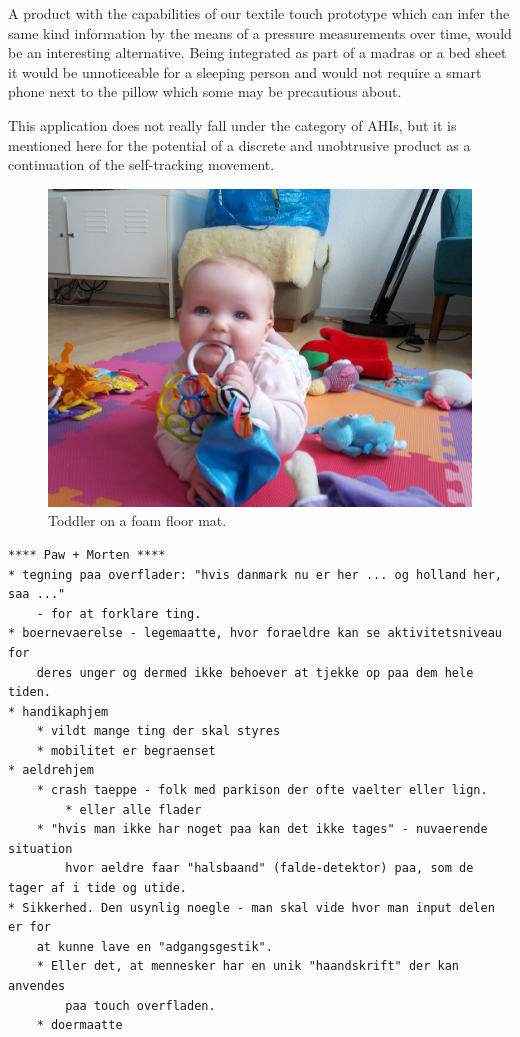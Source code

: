 A product with the capabilities of our textile touch prototype which can infer the same kind information by the means of a pressure measurements over time, would be an interesting alternative.
Being integrated as part of a madras or a bed sheet it would be unnoticeable for a sleeping person and would not require a smart phone next to the pillow which some may be precautious about.

This application does not really fall under the category of AHIs, but it is mentioned here for the potential of a discrete and unobtrusive product as a continuation of the self-tracking movement.


\begin{figure}[h]
  \centering
  \begin{minipage}[b]{.8\textwidth}
    \centering
    \includegraphics[width=.7\linewidth]{figures/touch/evaluation/softtiles}
  \caption[Toddler on a foam floor mat with puzzle-like tiles for extensibility.]
  {Toddler on a foam floor mat.}
  \label{fig:textiletouch:eval:softtiles}
  \end{minipage}
\end{figure}

\begin{verbatim}
**** Paw + Morten ****
* tegning paa overflader: "hvis danmark nu er her ... og holland her, saa ..." 
	- for at forklare ting.
* boernevaerelse - legemaatte, hvor foraeldre kan se aktivitetsniveau for 
	deres unger og dermed ikke behoever at tjekke op paa dem hele tiden.
* handikaphjem
	* vildt mange ting der skal styres
    * mobilitet er begraenset
* aeldrehjem
    * crash taeppe - folk med parkison der ofte vaelter eller lign.
        * eller alle flader
    * "hvis man ikke har noget paa kan det ikke tages" - nuvaerende situation 
		hvor aeldre faar "halsbaand" (falde-detektor) paa, som de tager af i tide og utide.
* Sikkerhed. Den usynlig noegle - man skal vide hvor man input delen er for 
	at kunne lave en "adgangsgestik".
    * Eller det, at mennesker har en unik "haandskrift" der kan anvendes 
		paa touch overfladen.
    * doermaatte
\end{verbatim}

